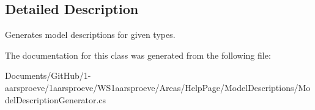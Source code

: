 \subsection{Detailed Description}
Generates model descriptions for given types. 



The documentation for this class was generated from the following file\+:\begin{DoxyCompactItemize}
\item 
Documents/\+Git\+Hub/1-\/aarsproeve/1aarsproeve/\+W\+S1aarsproeve/\+Areas/\+Help\+Page/\+Model\+Descriptions/Model\+Description\+Generator.\+cs\end{DoxyCompactItemize}
